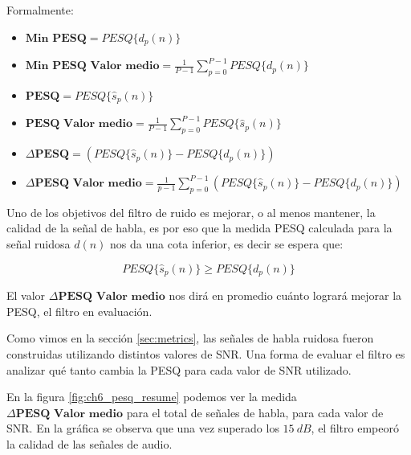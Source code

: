 Formalmente:

\begin{itemize}
	\item $\textbf{Min PESQ} = PESQ\{ d_p(n) \}$
	\item $\textbf{Min PESQ Valor medio} = \frac{1}{P-1} \sum_{p=0}^{P-1} PESQ\{ d_p(n) \}$
	\item $\textbf{PESQ} = PESQ\{ \hat{s}_p(n) \}$
	\item $\textbf{PESQ Valor medio} = \frac{1}{P-1} \sum_{p=0}^{P-1} PESQ\{ \hat{s}_p(n) \}$
	\item $\Delta \textbf{PESQ} = \left( PESQ\{ \hat{s}_p(n) \} - PESQ\{ d_p(n) \} \right)$
	\item $\Delta \textbf{PESQ Valor medio} = \frac{1}{p-1} \sum_{p=0}^{P-1} \left( PESQ\{ \hat{s}_p(n) \} - PESQ\{ d_p(n) \} \right)$
\end{itemize}

Uno de los objetivos del filtro de ruido es mejorar, o al menos mantener, la calidad de la señal de habla, es por eso que la medida PESQ calculada para la señal ruidosa $d(n)$ nos da una cota inferior, es decir se espera que:

\begin{equation*}
	PESQ\{ \hat{s}_p(n) \} \geq PESQ\{ d_p(n) \}
\end{equation*}

El valor $\Delta \textbf{PESQ Valor medio}$ nos dirá en promedio cuánto logrará mejorar la PESQ, el filtro en evaluación.

Como vimos en la sección \ref{sec:metrics}, las señales de habla ruidosa fueron construidas utilizando distintos valores de SNR. Una forma de evaluar el filtro es analizar qué tanto cambia la PESQ para cada valor de SNR utilizado.

En la figura \ref{fig:ch6_pesq_resume} podemos ver la medida $\Delta \textbf{PESQ Valor medio}$ para el total de señales de habla, para cada valor de SNR. En la gráfica se observa que una vez superado los $\SI{15}{dB}$, el filtro empeoró la calidad de las señales de audio.

